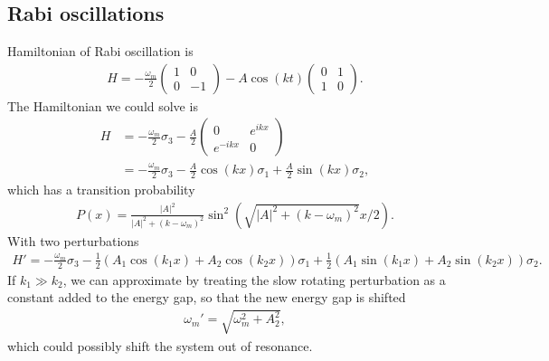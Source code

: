 \documentclass[letterpaper,12pt,english]{sphinxmanual}
\begin{document}
\subsection{Rabi oscillations}
\label{\detokenize{matter-stimulated/picture:rabi-oscillations}}
Hamiltonian of Rabi oscillation is
\begin{equation*}
\begin{split}H = -\frac{\omega_m}{2} \begin{pmatrix} 1 & 0 \\ 0 & -1 \end{pmatrix} - A \cos(k t)\begin{pmatrix} 0 & 1 \\ 1 & 0  \end{pmatrix} .\end{split}
\end{equation*}
The Hamiltonian we could solve is
\begin{equation*}
\begin{split}H &= -\frac{\omega_m}{2} \sigma_3 - \frac{A}{2} \begin{pmatrix}0 & e^{i k x} \\ e^{-i k x} & 0 \end{pmatrix} \\
& =  -\frac{\omega_m}{2} \sigma_3 - \frac{A}{2} \cos(kx) \sigma_1 + \frac{A}{2} \sin (kx) \sigma_2 ,\end{split}
\end{equation*}
which has a transition probability
\begin{equation*}
\begin{split}P(x) = \frac{\lvert A\rvert^2}{ \lvert A\rvert^2 + (k - \omega_m)^2 }  \sin^2 \left( \sqrt{ \lvert A\rvert^2 + (k - \omega_m)^2 } x/2 \right).\end{split}
\end{equation*}
With two perturbations
\begin{equation*}
\begin{split}H' = -\frac{\omega_m}{2} \sigma_3  - \frac{1}{2} (A_1 \cos(k_1 x) + A_2 \cos(k_2 x)) \sigma_1 + \frac{1}{2}( A_1 \sin (k_1x) + A_2 \sin (k_2 x) ) \sigma_2.\end{split}
\end{equation*}
If \(k_1 \gg k_2\), we can approximate by treating the slow rotating perturbation as a constant added to the energy gap, so that the new energy gap is shifted
\begin{equation*}
\begin{split}\omega_m' = \sqrt{ \omega_m^2 + A_2^2 },\end{split}
\end{equation*}
which could possibly shift the system out of resonance.
\end{document}
